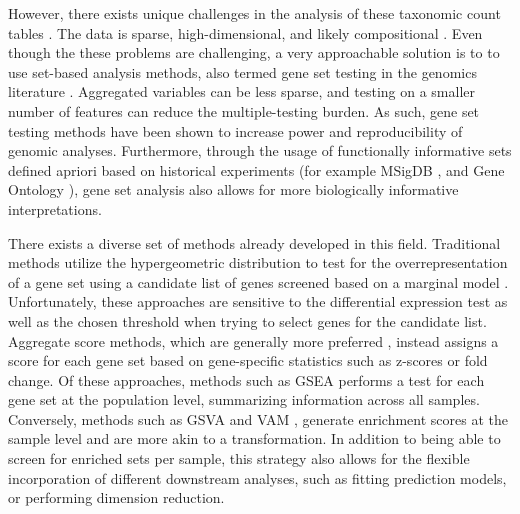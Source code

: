 \documentclass[10pt,letterpaper]{article}
\begin{document}
However, there exists unique challenges in the analysis of these taxonomic count tables \cite{li2019a,li2015}. The data is sparse, high-dimensional, and likely compositional \cite{gloor2017, li2019a, li2015}. Even though the these problems are challenging, a very approachable solution is to to use set-based analysis methods, also termed gene set testing in the genomics literature \cite{khatri2012, goeman2007}. Aggregated variables can be less sparse, and testing on a smaller number of features can reduce the multiple-testing burden. As such, gene set testing methods have been shown to increase power and reproducibility of genomic analyses. Furthermore, through the usage of functionally informative sets defined apriori based on historical experiments (for example MSigDB \cite{subramanian2005}, and Gene Ontology \cite{ashburner2000}), gene set analysis also allows for more biologically informative interpretations. 

There exists a diverse set of methods already developed in this field. Traditional methods utilize the hypergeometric distribution to test for the overrepresentation of a gene set using a candidate list of genes screened based on a marginal model \cite{goeman2007}. Unfortunately, these approaches are sensitive to the differential expression test as well as the chosen threshold when trying to select genes for the candidate list. Aggregate score methods, which are generally more preferred \cite{irizarry2009}, instead assigns a score for each gene set based on gene-specific statistics such as z-scores or fold change. Of these approaches, methods such as GSEA \cite{subramanian2005} performs a test for each gene set at the population level, summarizing information across all samples. Conversely, methods such as GSVA \cite{hanzelmann2013} and VAM \cite{frost2020}, generate enrichment scores at the sample level and are more akin to a transformation. In addition to being able to screen for enriched sets per sample, this strategy also allows for the flexible incorporation of different downstream analyses, such as fitting prediction models, or performing dimension reduction.  

\end{document}
